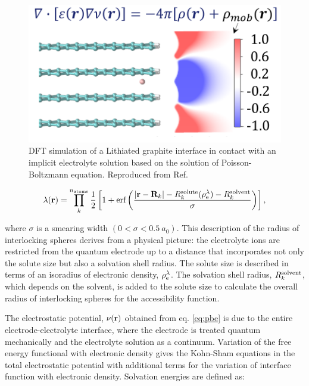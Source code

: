 \documentclass[../main.tex]{subfiles}
\begin{document}
\begin{figure}
    \centering
    \includegraphics[scale=0.7]{figures/DFT+Continuum.png}
    \caption{DFT simulation of a Lithiated graphite interface in contact with an implicit electrolyte solution based on the solution of Poisson-Boltzmann equation. Reproduced from Ref. }
    \label{fig:DFT+continuum}
\end{figure}

\begin{equation}
    \label{eq:access}
    \lambda\!\left(\mathbf{r}\right) = \prod\limits_{k}^{n_\textrm{atoms}}\frac{1}{2}  \left[1+\textrm{erf}\left(\frac{|\textbf{r}-\textbf{R}_k|-R^{\rm solute}_k(\rho_{\textrm{e}}^\lambda)-R^{\rm solvent}_k}{\sigma}\right)\right],
\end{equation}

where $\sigma$ is a smearing width $(0<\sigma<0.5~a_0)$. This description of the radius of interlocking spheres derives from a physical picture: the electrolyte ions are restricted from the quantum electrode up to a distance that incorporates not only the solute size but also a solvation shell radius. The solute size is described in terms of an isoradius of electronic density, $\rho_{\textrm{e}}^\lambda$. The solvation shell radius, $R^{\rm solvent}_k$, which depends on the solvent, is added to the solute size to calculate the overall radius of interlocking spheres for the accessibility function.

The electrostatic potential, $\nu\!\left(\mathbf{r}\right)$ obtained from eq. \ref{eq:pbe} is due to the entire electrode-electrolyte interface, where the electrode is treated quantum mechanically and the electrolyte solution as a continuum. Variation of the free energy functional with electronic density gives the Kohn-Sham equations in the total electrostatic potential with additional terms for the variation of interface function with electronic density.\cite{Dziedzic2011, Ringe2016} Solvation energies are defined as:\cite{Ringe2016, Stein2019}
\end{document}
